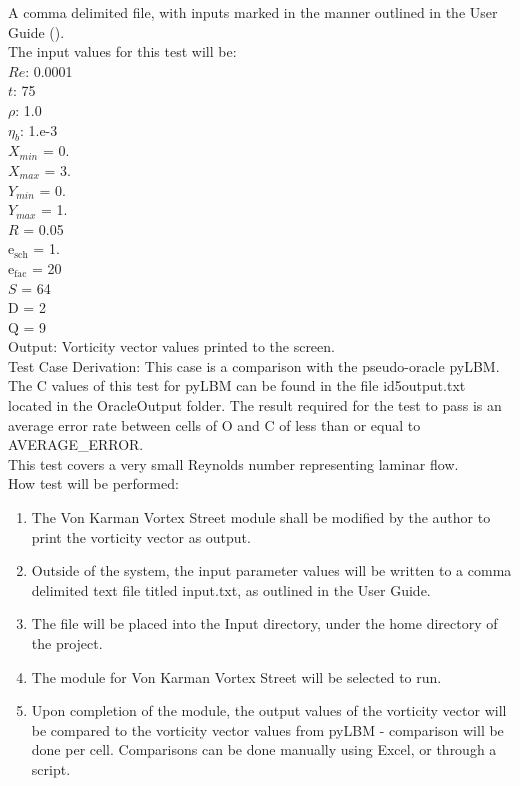\documentclass[12pt, titlepage]{article}
\begin{document}
\begin{enumerate}
A comma delimited file, with inputs marked in the manner outlined in the User
Guide (\citet{LBM_UserGuide_PM}).\\The input values for this test will be:\\
$Re$: 0.0001\\
$t$: 75\\
$\rho$: 1.0\\
$\eta_b$: 1.e-3\\
$X_{min}$ = 0.\\
$X_{max}$ = 3.\\
$Y_{min}$ = 0.\\
$Y_{max}$ = 1.\\
$R$ = 0.05\\
$\mathrm{e_{sch}}$ = 1.\\
$\mathrm{e_{fac}}$ = 20\\
$S$ = 64\\
$\mathrm{D}$ = 2\\
$\mathrm{Q}$ = 9\\
					
Output: Vorticity vector values printed to the screen.\\

Test Case Derivation: This case is a comparison with the pseudo-oracle
pyLBM. The C values of this test for pyLBM can be found in the file
id5output.txt located in the OracleOutput folder. The result required for the
test to pass is an average error rate between cells of O and C of less than or
equal to AVERAGE\_ERROR.\\

This test covers a very small Reynolds number representing laminar flow.\\

How test will be performed: 

\begin{enumerate}
\item The Von Karman Vortex Street module shall be modified by the author to
  print the vorticity vector as output.
\item Outside of the system, the input parameter values will be written to a
  comma delimited text file titled input.txt, as outlined in the User Guide.
\item The file will be placed into the Input directory, under the home directory
  of the project.
\item The module for Von Karman Vortex Street will be selected to run.
\item Upon completion of the module, the output values of the vorticity vector
  will be compared to the vorticity vector values from pyLBM - comparison will
  be done per cell. Comparisons can be done manually using Excel, or through a
  script.
\end{enumerate}


\end{enumerate}
\end{document}
